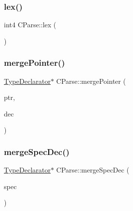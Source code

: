 \subsubsection{\texorpdfstring{lex()}{lex()}}
{\footnotesize\ttfamily int4 C\+Parse\+::lex (\begin{DoxyParamCaption}\item[{void}]{ }\end{DoxyParamCaption})}

\mbox{\label{class_c_parse_a523baf902e71f296a214b79e644d7a35}} 
\subsubsection{\texorpdfstring{mergePointer()}{mergePointer()}}
{\footnotesize\ttfamily \mbox{\hyperlink{class_type_declarator}{Type\+Declarator}}$\ast$ C\+Parse\+::merge\+Pointer (\begin{DoxyParamCaption}\item[{vector$<$ uint4 $>$ $\ast$}]{ptr,  }\item[{\mbox{\hyperlink{class_type_declarator}{Type\+Declarator}} $\ast$}]{dec }\end{DoxyParamCaption})}

\mbox{\label{class_c_parse_a98ccafc1e14edd4385106826cbbc9fe3}} 
\subsubsection{\texorpdfstring{mergeSpecDec()}{mergeSpecDec()}\hspace{0.1cm}{\footnotesize\ttfamily [1/2]}}
{\footnotesize\ttfamily \mbox{\hyperlink{class_type_declarator}{Type\+Declarator}}$\ast$ C\+Parse\+::merge\+Spec\+Dec (\begin{DoxyParamCaption}\item[{\mbox{\hyperlink{struct_type_specifiers}{Type\+Specifiers}} $\ast$}]{spec }\end{DoxyParamCaption})}

\mbox{\label{class_c_parse_a6191ca3b85862bdd8a74da0d9d02af38}} 

